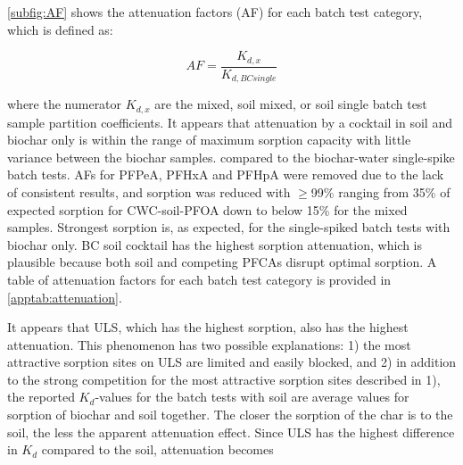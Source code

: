 \cref{subfig:AF} shows the attenuation factors (AF) for each batch test category, which is defined as: 

\begin{equation} \label{eq:AF}
    AF = \frac{K_{d,x}}{K_{d,BC single}}
\end{equation}

where the numerator $K_{d,x}$ are the mixed, soil mixed, or soil single batch test sample partition coefficients. It appears that attenuation by a cocktail in soil and biochar only is within the range  of maximum sorption capacity with little variance between the biochar samples. compared to the biochar-water single-spike batch tests. AFs for PFPeA, PFHxA and PFHpA were removed due to the lack of consistent results, and sorption was reduced with $\ge$99\% ranging from 35\% of expected sorption for CWC-soil-PFOA down to below 15\% for the mixed samples. Strongest sorption is, as expected, for the single-spiked batch tests with biochar only. BC soil cocktail has the highest sorption attenuation, which is plausible because both soil and competing PFCAs disrupt optimal sorption.  A table of attenuation factors for each batch test category is provided in \cref{apptab:attenuation}.

It appears that ULS, which has the highest sorption, also has the highest attenuation. This phenomenon has two possible explanations: 1) the most attractive sorption sites on ULS are limited and easily blocked, and 2) in addition to the strong competition for the most attractive sorption sites described in 1), the reported $K_d$-values for the batch tests with soil are average values for sorption of biochar and soil together. The closer the sorption of the char is to the soil, the less the apparent attenuation effect. Since ULS has the highest difference in $K_d$ compared to the soil, attenuation becomes 

